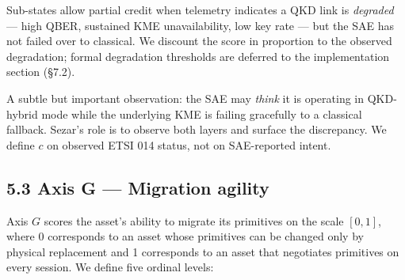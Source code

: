 Sub-states allow partial credit when telemetry indicates a QKD link is
\emph{degraded} --- high QBER, sustained KME unavailability, low key
rate --- but the SAE has not failed over to classical. We discount the
score in proportion to the observed degradation; formal degradation
thresholds are deferred to the implementation section (§7.2).

A subtle but important observation: the SAE may \emph{think} it is
operating in QKD-hybrid mode while the underlying KME is failing
gracefully to a classical fallback. Sezar's role is to observe both
layers and surface the discrepancy. We define \(c\) on observed ETSI 014
status, not on SAE-reported intent.

\subsection{5.3 Axis G --- Migration
agility}\label{axis-g-migration-agility}

Axis \(G\) scores the asset's ability to migrate its primitives on the
scale \([0, 1]\), where 0 corresponds to an asset whose primitives can
be changed only by physical replacement and 1 corresponds to an asset
that negotiates primitives on every session. We define five ordinal
levels:


